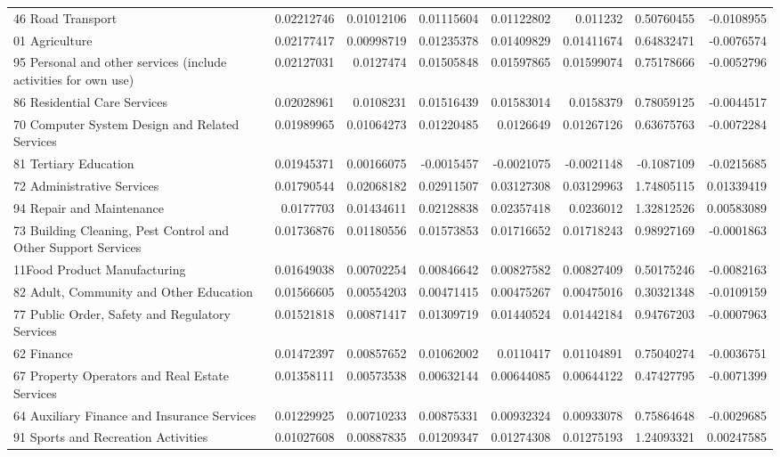 \documentclass{monashthesis}
\begin{document}
\begin{table}[ht]
{\begin{tabular}{|l|r|rrrr|rr|}
    46 Road Transport & 0.02212746 & 0.01012106 & 0.01115604 & 0.01122802 & 0.011232 & 0.50760455 & -0.0108955 \\
    01 Agriculture & 0.02177417 & 0.00998719 & 0.01235378 & 0.01409829 & 0.01411674 & 0.64832471 & -0.0076574 \\
    95 Personal and other services (include activities for own use) & 0.02127031 & 0.0127474 & 0.01505848 & 0.01597865 & 0.01599074 & 0.75178666 & -0.0052796 \\
    86 Residential Care Services & 0.02028961 & 0.0108231 & 0.01516439 & 0.01583014 & 0.0158379 & 0.78059125 & -0.0044517 \\
    70 Computer System Design and Related Services & 0.01989965 & 0.01064273 & 0.01220485 & 0.0126649 & 0.01267126 & 0.63675763 & -0.0072284 \\
    81 Tertiary Education & 0.01945371 & 0.00166075 & -0.0015457 & -0.0021075 & -0.0021148 & -0.1087109 & -0.0215685 \\
    72 Administrative Services & 0.01790544 & 0.02068182 & 0.02911507 & 0.03127308 & 0.03129963 & 1.74805115 & 0.01339419 \\
    94 Repair and Maintenance & 0.0177703 & 0.01434611 & 0.02128838 & 0.02357418 & 0.0236012 & 1.32812526 & 0.00583089 \\
    73 Building Cleaning, Pest Control and Other Support Services & 0.01736876 & 0.01180556 & 0.01573853 & 0.01716652 & 0.01718243 & 0.98927169 & -0.0001863 \\
    11Food Product Manufacturing & 0.01649038 & 0.00702254 & 0.00846642 & 0.00827582 & 0.00827409 & 0.50175246 & -0.0082163 \\
    82 Adult, Community and Other Education & 0.01566605 & 0.00554203 & 0.00471415 & 0.00475267 & 0.00475016 & 0.30321348 & -0.0109159 \\
    77 Public Order, Safety and Regulatory Services & 0.01521818 & 0.00871417 & 0.01309719 & 0.01440524 & 0.01442184 & 0.94767203 & -0.0007963 \\
    62 Finance & 0.01472397 & 0.00857652 & 0.01062002 & 0.0110417 & 0.01104891 & 0.75040274 & -0.0036751 \\
    67 Property Operators and Real Estate Services & 0.01358111 & 0.00573538 & 0.00632144 & 0.00644085 & 0.00644122 & 0.47427795 & -0.0071399 \\
    64 Auxiliary Finance and Insurance Services & 0.01229925 & 0.00710233 & 0.00875331 & 0.00932324 & 0.00933078 & 0.75864648 & -0.0029685 \\
    91 Sports and Recreation Activities & 0.01027608 & 0.00887835 & 0.01209347 & 0.01274308 & 0.01275193 & 1.24093321 & 0.00247585 \\

\end{tabular}}
\end{table}
\end{document}
